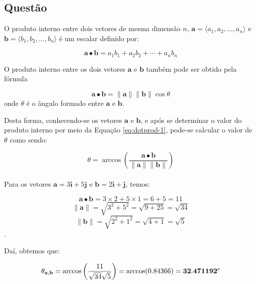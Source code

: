 \documentclass[a4paper,11pt,pagenumber=true]{article}
\newcommand{\veca}{$\mathbf{a}$}
\newcommand{\vecb}{$\mathbf{b}$}
\newcommand{\vecnorm}[1]{\|\mathbf{#1}\|}
\newcommand{\dotprod}[2]{\mathbf{#1} \bullet \mathbf{#2}}
\theoremstyle{mytheor}
\begin{document}
        \subsection{Questão }
        
            O produto interno entre dois vetores de mesma dimensão $n$, 
            $\mathbf{a} = \langle a_1, a_2, \dotsc, a_n \rangle$ e
            $\mathbf{b} = \langle b_1, b_2, \dotsc, b_n \rangle$ é um escalar definido por:
            
            \begin{equation}\label{eq:dotprod-1}
                \dotprod{a}{b} = a_1 b_1 + a_2 b_2 + \dotsb + a_n b_n
            \end{equation}
            
            O produto interno entre os dois vetores \veca{} e \vecb{} também pode ser obtido pela fórmula
            
            \begin{equation}\label{eq:dotprod-2}
                \dotprod{a}{b} = \vecnorm{a} \vecnorm{b} \cos \theta
            \end{equation} onde $\theta$ é o ângulo formado entre \veca{} e \vecb{}.
            
            Desta forma, conhecendo-se os vetores \veca{} e \vecb{}, e após se determinar o valor do 
            produto interno por meio da Equação \ref{eq:dotprod-1}, pode-se calcular o valor de $\theta$ como sendo: 
            
            \begin{equation}\label{internal-angle}
                \theta = \arccos \left(\frac{\dotprod{a}{b}}{\vecnorm{a}\vecnorm{b}}\right)
            \end{equation} \\
            
            Para os vetores $\mathbf{a} = 3\mathbf{i} + 5\mathbf{j}$ e 
            $\mathbf{b} = 2\mathbf{i} + \mathbf{j}$, temos:
            
            \[\dotprod{a}{b} = 3\times2 + 5\times1 = 6 + 5 = 11\]
            \[\vecnorm{a} = \sqrt{3^2 + 5^2} = \sqrt{9 + 25} = \sqrt{34}\] 
            \[\vecnorm{b} = \sqrt{2^2 + 1^2} = \sqrt{4 + 1} = \sqrt{5}\].
            
            Daí, obtemos que: 
        
            \[
                \theta_{\mathbf{a},\mathbf{b}} = \arccos \left(\frac{11}{\sqrt{34}\sqrt{5}}\right) =
                \arccos(0.84366) = \mathbf{32.471192\degree}
            \]
            
\end{document}
